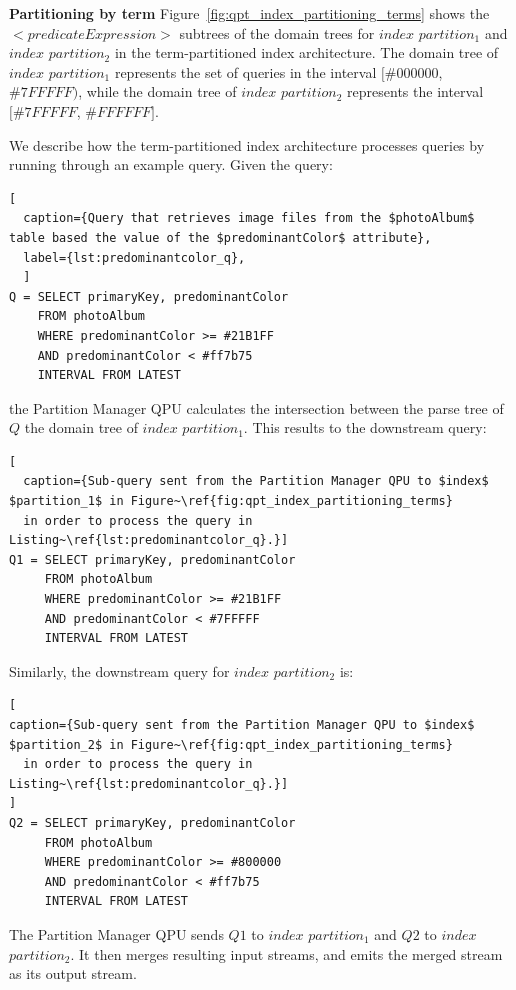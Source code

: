 \medskip
\noindent
\textbf{Partitioning by term}
Figure~\ref{fig:qpt_index_partitioning_terms} shows the $<predicateExpression>$ subtrees of the domain trees
for $index$ $partition_1$ and $index$ $partition_2$ in the term-partitioned index architecture.
The domain tree of $index$ $partition_1$ represents the set of queries in the interval $[\#000000$, $\#7FFFFF)$,
while the domain tree of $index$ $partition_2$ represents the interval $[\#7FFFFF$, $\#FFFFFF]$.

We describe how the term-partitioned index architecture processes queries by running through an example query.
Given the query:

\begin{lstlisting}[
  caption={Query that retrieves image files from the $photoAlbum$ table based the value of the $predominantColor$ attribute},
  label={lst:predominantcolor_q},
  ]
Q = SELECT primaryKey, predominantColor
    FROM photoAlbum
    WHERE predominantColor >= #21B1FF
    AND predominantColor < #ff7b75
    INTERVAL FROM LATEST
\end{lstlisting}

\noindent
the Partition Manager QPU calculates the intersection between the parse tree of $Q$ the domain tree of $index$ $partition_1$.
This results to the downstream query:

\begin{lstlisting}[
  caption={Sub-query sent from the Partition Manager QPU to $index$ $partition_1$ in Figure~\ref{fig:qpt_index_partitioning_terms}
  in order to process the query in Listing~\ref{lst:predominantcolor_q}.}]
Q1 = SELECT primaryKey, predominantColor
     FROM photoAlbum
     WHERE predominantColor >= #21B1FF
     AND predominantColor < #7FFFFF
     INTERVAL FROM LATEST
\end{lstlisting}

\noindent
Similarly, the downstream query for $index$ $partition_2$ is:

\begin{lstlisting}[
caption={Sub-query sent from the Partition Manager QPU to $index$ $partition_2$ in Figure~\ref{fig:qpt_index_partitioning_terms}
  in order to process the query in Listing~\ref{lst:predominantcolor_q}.}]
]
Q2 = SELECT primaryKey, predominantColor
     FROM photoAlbum
     WHERE predominantColor >= #800000
     AND predominantColor < #ff7b75
     INTERVAL FROM LATEST
\end{lstlisting}

\noindent
The Partition Manager QPU sends $Q1$ to $index$ $partition_1$ and $Q2$ to $index$ $partition_2$.
It then merges resulting input streams, and emits the merged stream as its output stream.

